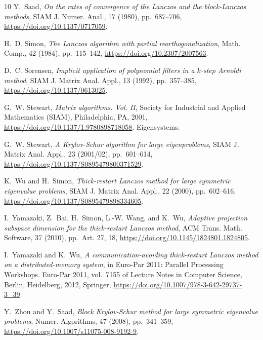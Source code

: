 \documentclass{siamart190516}
\begin{document}
\begin{thebibliography}{10}
{\sc Y.~Saad}, {\em On the rates of convergence of the {L}anczos and the block-{L}anczos methods}, SIAM J. Numer. Anal., 17 (1980), pp.~687--706, \url{https://doi.org/10.1137/0717059}.

{\sc H.~D. Simon}, {\em The {L}anczos algorithm with partial reorthogonalization}, Math. Comp., 42 (1984), pp.~115--142, \url{https://doi.org/10.2307/2007563}.

{\sc D.~C. Sorensen}, {\em Implicit application of polynomial filters in a {$k$}-step {A}rnoldi method}, SIAM J. Matrix Anal. Appl., 13 (1992), pp.~357--385, \url{https://doi.org/10.1137/0613025}.

{\sc G.~W. Stewart}, {\em Matrix algorithms. {V}ol. {II}}, Society for Industrial and Applied Mathematics (SIAM), Philadelphia, PA, 2001, \url{https://doi.org/10.1137/1.9780898718058}.
\newblock Eigensystems.

{\sc G.~W. Stewart}, {\em A {K}rylov-{S}chur algorithm for large eigenproblems}, SIAM J. Matrix Anal. Appl., 23 (2001/02), pp.~601--614, \url{https://doi.org/10.1137/S0895479800371529}.

{\sc K.~Wu and H.~Simon}, {\em Thick-restart {L}anczos method for large symmetric eigenvalue problems}, SIAM J. Matrix Anal. Appl., 22 (2000), pp.~602--616, \url{https://doi.org/10.1137/S0895479898334605}.

{\sc I.~Yamazaki, Z.~Bai, H.~Simon, L.-W. Wang, and K.~Wu}, {\em Adaptive projection subspace dimension for the thick-restart {L}anczos method}, ACM Trans. Math. Software, 37 (2010), pp.~Art. 27, 18, \url{https://doi.org/10.1145/1824801.1824805}.

{\sc I.~Yamazaki and K.~Wu}, {\em A communication-avoiding thick-restart {L}anczos method on a distributed-memory system}, in Euro-Par 2011: Parallel Processing Workshops. Euro-Par 2011, vol.~7155 of Lecture Notes in Computer Science, Berlin, Heidelberg, 2012, Springer, \url{https://doi.org/10.1007/978-3-642-29737-3\_39}.

{\sc Y.~Zhou and Y.~Saad}, {\em Block {K}rylov-{S}chur method for large symmetric eigenvalue problems}, Numer. Algorithms, 47 (2008), pp.~341--359, \url{https://doi.org/10.1007/s11075-008-9192-9}.

\end{thebibliography}
\end{document}
